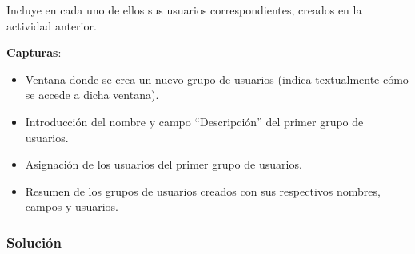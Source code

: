 \begin{enumerate}[label=2.\alph*)]
    Incluye en cada uno de ellos sus usuarios correspondientes, creados en la actividad anterior.

    \textbf{Capturas}:
    \begin{itemize}
        \item Ventana donde se crea un nuevo grupo de usuarios (indica textualmente cómo se accede a dicha ventana).
        \item Introducción del nombre y campo ``Descripción'' del primer grupo de usuarios.
        \item Asignación de los usuarios del primer grupo de usuarios.
        \item Resumen de los grupos de usuarios creados con sus respectivos nombres, campos y usuarios.
    \end{itemize}
\end{enumerate}

\subsubsection{Solución}

